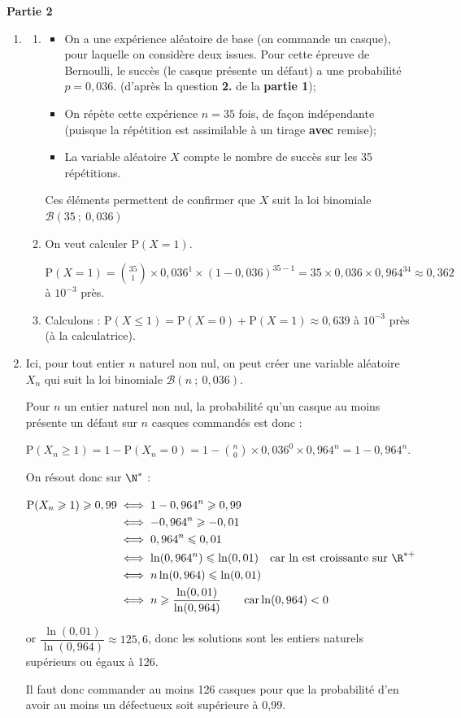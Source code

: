 \textbf{Partie 2}
\begin{enumerate}
\item 
	\begin{enumerate}
		\item 
		
\begin{itemize}
\item On a une expérience aléatoire de base (on commande un casque), pour laquelle on considère deux issues. Pour cette épreuve de Bernoulli, le succès (le casque présente un défaut) a une probabilité $p = 0,036$. (d'après la question \textbf{2.} de la \textbf{partie 1});
\item On répète cette expérience $n=35$ fois, de façon indépendante (puisque la répétition est assimilable à un tirage \textbf{avec} remise);
\item La variable aléatoire $X$ compte le nombre de succès sur les 35 répétitions.
\end{itemize}

Ces éléments permettent de confirmer que $X$ suit la loi binomiale $ \mathcal{B}(35~;~0,036) $

\item On veut calculer $\mathrm{P}(X = 1)$.

$ \mathrm{P}(X = 1) = \displaystyle \binom{35}{1} \times 0,036^1 \times (1 - 0,036)^{35- 1} = 35 \times 0,036 \times 0,964^{34} \approx 0,362 $ à $ 10^{-3} $ près.

\item Calculons : $\mathrm{P}(X \leqslant 1) = \mathrm{P}(X = 0) + \mathrm{P}(X = 1) \approx 0,639$ à $ 10^{-3} $ près (à la calculatrice).
	\end{enumerate}

	\item Ici, pour tout entier $n$ naturel non nul, on peut créer une variable aléatoire $X_n$ qui suit la loi binomiale $ \mathcal{B}(n~;~0,036) $.

	Pour $n$ un entier naturel non nul, la probabilité qu'un casque au moins présente un défaut sur $n$ casques commandés est donc :

$\mathrm{P}(X_n \geqslant 1) = 1 - \mathrm{P} (X_n = 0) = 1 - \displaystyle \binom{n}{0}\times 0,036^0 \times 0,964^{n} = 1 - 0,964^{n}$.

On résout donc sur $\N^*$ :

$\begin{aligned}[t] \mathrm{P}(X_n \geqslant 1) \geqslant 0,99
&\iff 1 - 0,964^{n} \geqslant 0,99\\
&\iff -0,964^n \geqslant -0,01\\
&\iff 0,964^n \leqslant 0,01\\
&\iff \ln(0,964^n) \leqslant \ln(0,01) \quad \text{car ln est croissante sur }\R^{*+} \\
&\iff n\ln(0,964) \leqslant \ln(0,01)\\
&\iff n \geqslant \dfrac{\ln(0,01)}{\ln(0,964)} \qquad \text{car} \ln(0,964) <0
\end{aligned}$

or $\dfrac{\ln(0,01)}{\ln(0,964)}\approx 125,6$, donc les solutions sont les entiers naturels supérieurs ou égaux à 126.

Il faut donc commander au moins 126 casques pour que la probabilité d'en avoir au moins un défectueux soit supérieure à 0,99.

\end{enumerate}

\bigskip
